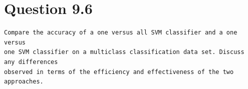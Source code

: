 \documentclass[11pt]{article}
\newenvironment{code}{\captionsetup{type=listing}}{}
\begin{document}
\begin{code}
\label{code:q3}
\end{code}
\begin{code}
\label{code:q3p}
\end{code}
\newpage
\section{Question 9.6} \label{q4}
\begin{verbatim}
Compare the accuracy of a one versus all SVM classifier and a one versus
one SVM classifier on a multiclass classification data set. Discuss any differences
observed in terms of the efficiency and effectiveness of the two approaches.
\end{verbatim}
\end{document}
